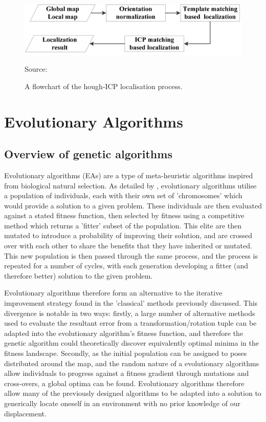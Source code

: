 \documentclass[authoryearcitations]{UoYCSproject}
\begin{document}
\begin{figure}[ht]
	\centering
	\includegraphics[width=12cm,keepaspectratio]{images/hough_icp.png}
	\caption[Hough-ICP localisation process]{A flowchart of the hough-ICP localisation process.}{Source: \citet{Ma2016-es}}
	\label{fig:hough_icp_flowchart}
\end{figure}

\color{black}

\section{Evolutionary Algorithms}
\label{sec:evo_approaches}
\subsection{Overview of genetic algorithms}
Evolutionary algorithms (EAs) are a type of meta-heuristic algorithms inspired from biological natural selection. As detailed by \citet{Whitley1994-tx}, evolutionary algorithms utilise a population of individuals, each with their own set of 'chromosomes' which would provide a solution to a given problem. These individuals are then evaluated against a stated fitness function, then selected by fitness using a competitive method which returns a 'fitter' subset of the population. This elite are then mutated to introduce a probability of improving their solution, and are crossed over with each other to share the benefits that they have inherited or mutated. This new population is then passed through the same process, and the process is repeated for a number of cycles, with each generation developing a fitter (and therefore better) solution to the given problem. \newline

Evolutionary algorithms therefore form an alternative to the iterative improvement strategy found in the 'classical' methods previously discussed. This divergence is notable in two ways: firstly, a large number of alternative methods used to evaluate the resultant error from a transformation/rotation tuple can be adapted into the evolutionary algorithm's fitness function, and therefore the genetic algorithm could theoretically discover equivalently optimal minima in the fitness landscape. Secondly, as the initial population can be assigned to poses distributed around the map, and the random nature of a evolutionary algorithms allow individuals to progress against a fitness gradient through mutations and cross-overs, a global optima can be found. Evolutionary algorithms therefore allow many of the previously designed algorithms to be adapted into a solution to generically locate oneself in an environment with no prior knowledge of our displacement.\newline
\end{document}
